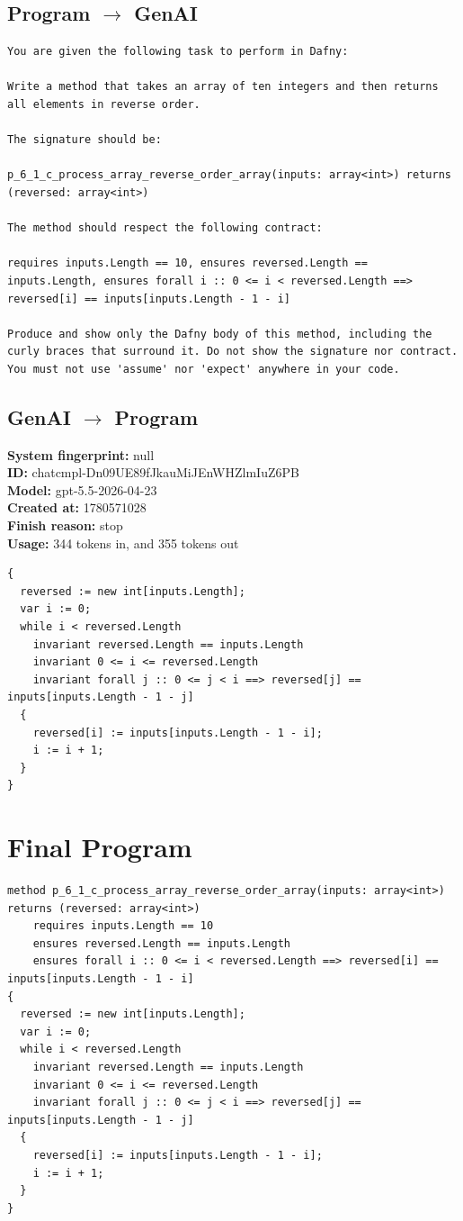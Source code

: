 \documentclass{article}
\begin{document}
\subsection*{Program $\rightarrow$ GenAI}
\begin{lstlisting}
You are given the following task to perform in Dafny:

Write a method that takes an array of ten integers and then returns all elements in reverse order.

The signature should be:

p_6_1_c_process_array_reverse_order_array(inputs: array<int>) returns (reversed: array<int>)

The method should respect the following contract:

requires inputs.Length == 10, ensures reversed.Length == inputs.Length, ensures forall i :: 0 <= i < reversed.Length ==> reversed[i] == inputs[inputs.Length - 1 - i]

Produce and show only the Dafny body of this method, including the curly braces that surround it. Do not show the signature nor contract. You must not use 'assume' nor 'expect' anywhere in your code.
\end{lstlisting}
\subsection*{GenAI $\rightarrow$ Program}
\textbf{System fingerprint: }null
\\\textbf{ID: }chatcmpl-Dn09UE89fJkauMiJEnWHZlmIuZ6PB
\\\textbf{Model: }gpt-5.5-2026-04-23
\\\textbf{Created at: }1780571028
\\\textbf{Finish reason: }stop
\\\textbf{Usage: }344 tokens in, and 355 tokens out
\begin{lstlisting}
{
  reversed := new int[inputs.Length];
  var i := 0;
  while i < reversed.Length
    invariant reversed.Length == inputs.Length
    invariant 0 <= i <= reversed.Length
    invariant forall j :: 0 <= j < i ==> reversed[j] == inputs[inputs.Length - 1 - j]
  {
    reversed[i] := inputs[inputs.Length - 1 - i];
    i := i + 1;
  }
}
\end{lstlisting}
\section*{Final Program}
\begin{lstlisting}
method p_6_1_c_process_array_reverse_order_array(inputs: array<int>) returns (reversed: array<int>)
	requires inputs.Length == 10
	ensures reversed.Length == inputs.Length
	ensures forall i :: 0 <= i < reversed.Length ==> reversed[i] == inputs[inputs.Length - 1 - i]
{
  reversed := new int[inputs.Length];
  var i := 0;
  while i < reversed.Length
    invariant reversed.Length == inputs.Length
    invariant 0 <= i <= reversed.Length
    invariant forall j :: 0 <= j < i ==> reversed[j] == inputs[inputs.Length - 1 - j]
  {
    reversed[i] := inputs[inputs.Length - 1 - i];
    i := i + 1;
  }
}
\end{lstlisting}
\end{document}
